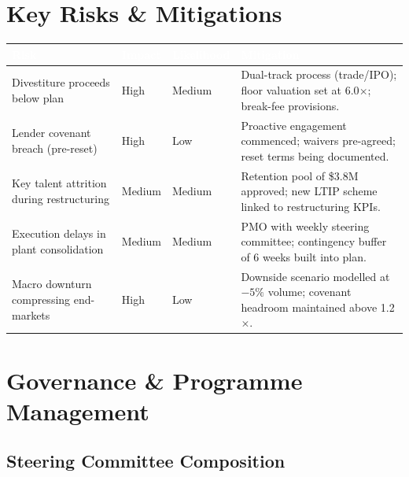 \documentclass[11pt,a4paper]{article}
\begin{document}
\section{Key Risks \& Mitigations}

\vspace{4pt}
\noindent
\begin{tabularx}{\linewidth}{@{}p{3.2cm}p{1.4cm}p{1.4cm}X@{}}
  \toprule
  \rowcolor{NavyDeep}
  \textcolor{white}{\textbf{Risk}} &
  \textcolor{white}{\textbf{Impact}} &
  \textcolor{white}{\textbf{Likelihood}} &
  \textcolor{white}{\textbf{Mitigation}} \\
  \midrule
  Divestiture proceeds below plan &
    High & Medium &
    Dual-track process (trade/IPO); floor valuation set at 6.0$\times$; break-fee provisions. \\
  \rowcolor{IceFog}
  Lender covenant breach (pre-reset) &
    High & Low &
    Proactive engagement commenced; waivers pre-agreed; reset terms being documented. \\
  Key talent attrition during restructuring &
    Medium & Medium &
    Retention pool of \$3.8M approved; new LTIP scheme linked to restructuring KPIs. \\
  \rowcolor{IceFog}
  Execution delays in plant consolidation &
    Medium & Medium &
    PMO with weekly steering committee; contingency buffer of 6 weeks built into plan. \\
  Macro downturn compressing end-markets &
    High & Low &
    Downside scenario modelled at $-5\%$ volume; covenant headroom maintained above 1.2$\times$. \\
  \bottomrule
\end{tabularx}

\vspace{14pt}

\section{Governance \& Programme Management}

\subsection{Steering Committee Composition}
\end{document}
